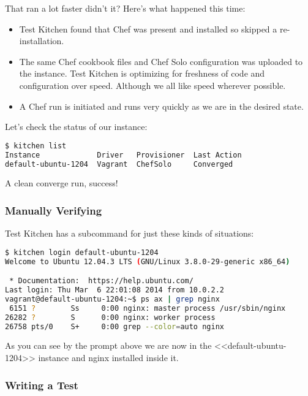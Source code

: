 That ran a lot faster didn't it? Here's what happened this time:

\begin{itemize}
  \item Test Kitchen found that Chef was present and installed so skipped a re-installation.
  \item The same Chef cookbook files and Chef Solo configuration was uploaded to the instance. Test Kitchen is optimizing for freshness of code and configuration over speed. Although we all like speed wherever possible.
  \item A Chef run is initiated and runs very quickly as we are in the desired state.
\end{itemize}

Let's check the status of our instance:

\begin{lstlisting}[language=Bash,label=lst:testing-test-kitchen11]
$ kitchen list
Instance             Driver   Provisioner  Last Action
default-ubuntu-1204  Vagrant  ChefSolo     Converged
\end{lstlisting}

A clean converge run, success!





\subsubsection{Manually Verifying}

Test Kitchen has a  subcommand for just these kinds of situations:

\begin{lstlisting}[language=Bash,label=lst:testing-test-kitchen12]
$ kitchen login default-ubuntu-1204
Welcome to Ubuntu 12.04.3 LTS (GNU/Linux 3.8.0-29-generic x86_64)

 * Documentation:  https://help.ubuntu.com/
Last login: Thu Mar  6 22:01:08 2014 from 10.0.2.2
vagrant@default-ubuntu-1204:~$ ps ax | grep nginx
 6151 ?        Ss     0:00 nginx: master process /usr/sbin/nginx
26282 ?        S      0:00 nginx: worker process
26758 pts/0    S+     0:00 grep --color=auto nginx
\end{lstlisting}

As you can see by the prompt above we are now in the <<default-ubuntu-1204>> instance and nginx installed inside it.




\subsubsection{Writing a Test}

